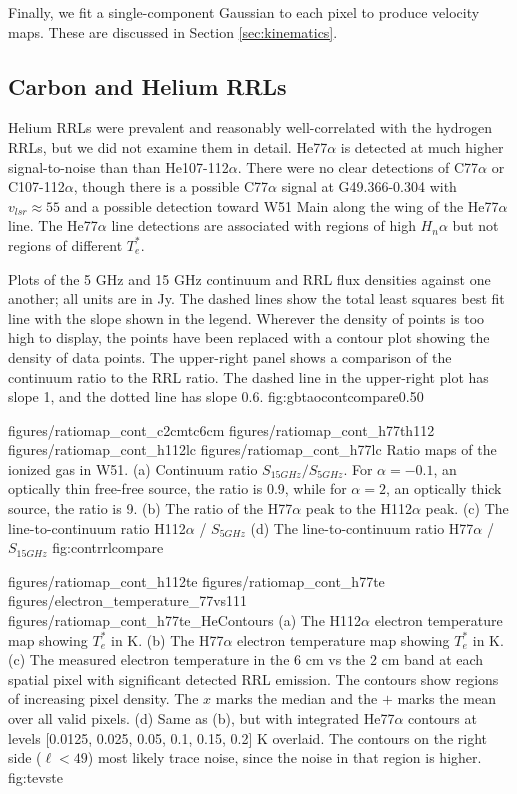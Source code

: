 Finally, we fit a single-component Gaussian to each pixel to produce velocity
maps.  These are discussed in Section \ref{sec:kinematics}.

\subsection{Carbon and Helium RRLs}
Helium RRLs were prevalent and reasonably well-correlated with the hydrogen
RRLs, but we did not examine them in detail.  He77$\alpha$ is detected at much
higher signal-to-noise than than He107-112$\alpha$.  There were no clear
detections of C77$\alpha$ or C107-112$\alpha$, though there is a possible
C77$\alpha$ signal at G49.366-0.304 with $v_{lsr} \approx 55$ \kms and a
possible detection toward W51 Main along the wing of the He77$\alpha$ line.
The He77$\alpha$ line detections are associated with regions of high $H_n\alpha$
but not regions of different $T_e^*$.


{Plots of the 5 GHz and 15 GHz continuum and RRL flux densities against one
another; all units are in Jy.  The dashed lines show the total least squares
best fit line with the slope shown in the legend.  Wherever the density of
points is too high to display, the points have been replaced with a contour
plot showing the density of data points.  The upper-right panel shows a
comparison of the continuum ratio to the RRL ratio.  The dashed line in the
upper-right plot has slope 1, and the dotted line has slope 0.6.}
{fig:gbtaocontcompare}{0.5}{0}

\clearpage
\FigureFour
{figures/ratiomap_cont_c2cmtc6cm}
{figures/ratiomap_cont_h77th112}
{figures/ratiomap_cont_h112lc}
{figures/ratiomap_cont_h77lc}
{Ratio maps of the ionized gas in W51.  
(a) Continuum ratio $S_{15 GHz} / S_{5 GHz}$.  For $\alpha=-0.1$, an optically
thin free-free source, the ratio is 0.9, while for $\alpha=2$, an optically thick source,
the ratio is 9.
(b) The ratio of the H77$\alpha$ peak to the H112$\alpha$ peak.
(c) The line-to-continuum ratio H112$\alpha$ / $S_{5 GHz}$
(d) The line-to-continuum ratio H77$\alpha$ / $S_{15 GHz}$
}
{fig:contrrlcompare}

\FigureFourPDF
{figures/ratiomap_cont_h112te}
{figures/ratiomap_cont_h77te}
{figures/electron_temperature_77vs111}
{figures/ratiomap_cont_h77te_HeContours}
{(a) The H112$\alpha$ electron temperature map showing $T_e^*$ in K. 
(b) The H77$\alpha$ electron temperature map showing $T_e^*$ in K.
(c) The measured electron temperature in the 6 cm vs the 2 cm band at each spatial
pixel with significant detected RRL emission.  The contours show regions of
increasing pixel density.  The $x$ marks the median and the $+$ marks the mean
over all valid pixels.
(d) Same as (b), but with integrated He77$\alpha$ contours at levels [0.0125,
0.025, 0.05, 0.1, 0.15, 0.2] K \kms overlaid.  The contours on the right side
($\ell<49$) most likely trace noise, since the noise in that region is higher.
}
{fig:tevste}%
\clearpage

